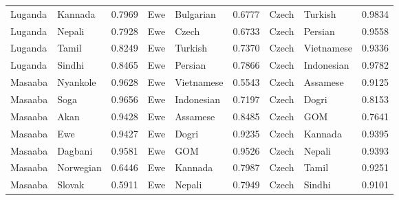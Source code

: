 \documentclass[11pt]{article} %
\begin{document}
\begin{table}
\begin{tabular}{llr@{\hspace{12pt}}llr@{\hspace{12pt}}llr}
            Luganda                      & Kannada             & 0.7969        & Ewe                 & Bulgarian           & 0.6777        & Czech               & Turkish             & 0.9834        \\
            Luganda                      & Nepali              & 0.7928        & Ewe                 & Czech               & 0.6733        & Czech               & Persian             & 0.9558        \\
            Luganda                      & Tamil               & 0.8249        & Ewe                 & Turkish             & 0.7370        & Czech               & Vietnamese          & 0.9336        \\
            Luganda                      & Sindhi              & 0.8465        & Ewe                 & Persian             & 0.7866        & Czech               & Indonesian          & 0.9782        \\
            Masaaba                      & Nyankole            & 0.9628        & Ewe                 & Vietnamese          & 0.5543        & Czech               & Assamese            & 0.9125        \\
            Masaaba                      & Soga                & 0.9656        & Ewe                 & Indonesian          & 0.7197        & Czech               & Dogri               & 0.8153        \\
            Masaaba                      & Akan                & 0.9428        & Ewe                 & Assamese            & 0.8485        & Czech               & GOM                 & 0.7641        \\
            Masaaba                      & Ewe                 & 0.9427        & Ewe                 & Dogri               & 0.9235        & Czech               & Kannada             & 0.9395        \\
            Masaaba                      & Dagbani             & 0.9581        & Ewe                 & GOM                 & 0.9526        & Czech               & Nepali              & 0.9393        \\
            Masaaba                      & Norwegian           & 0.6446        & Ewe                 & Kannada             & 0.7987        & Czech               & Tamil               & 0.9251        \\
            Masaaba                      & Slovak              & 0.5911        & Ewe                 & Nepali              & 0.7949        & Czech               & Sindhi              & 0.9101        \\

\end{tabular}
\end{table}
\end{document}
